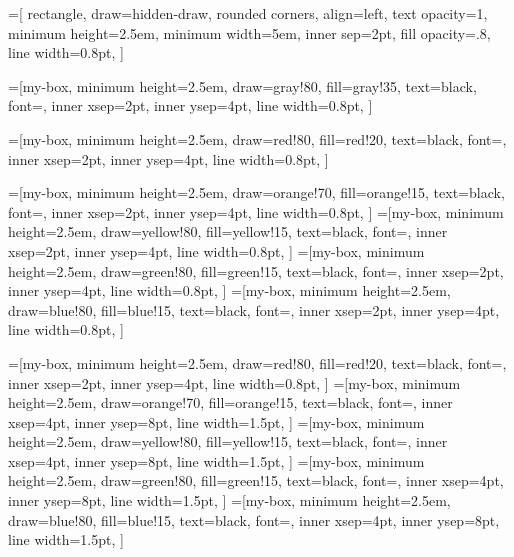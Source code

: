 

=[
    rectangle,
    draw=hidden-draw,
    rounded corners,
    align=left,
    text opacity=1,
    minimum height=2.5em,
    minimum width=5em,
    inner sep=2pt,
    fill opacity=.8,
    line width=0.8pt,
]

=[my-box, minimum height=2.5em,
    draw=gray!80, 
    fill=gray!35,  
    text=black, font=\normalsize,
    inner xsep=2pt,
    inner ysep=4pt,
    line width=0.8pt,
]

=[my-box, minimum height=2.5em,
    draw=red!80, 
    fill=red!20,  
    text=black, font=\normalsize,
    inner xsep=2pt,
    inner ysep=4pt,
    line width=0.8pt,
]

=[my-box, minimum height=2.5em,
    draw=orange!70, 
    fill=orange!15,  
    text=black, font=\normalsize,
    inner xsep=2pt,
    inner ysep=4pt,
    line width=0.8pt,
]
=[my-box, minimum height=2.5em,
    draw=yellow!80, 
    fill=yellow!15,  
    text=black, font=\normalsize,
    inner xsep=2pt,
    inner ysep=4pt,
    line width=0.8pt,
]
=[my-box, minimum height=2.5em,
    draw=green!80, 
    fill=green!15,  
    text=black, font=\normalsize,
    inner xsep=2pt,
    inner ysep=4pt,
    line width=0.8pt,
]
=[my-box, minimum height=2.5em,
    draw=blue!80, 
    fill=blue!15,  
    text=black, font=\normalsize,
    inner xsep=2pt,
    inner ysep=4pt,
    line width=0.8pt,
]

=[my-box, minimum height=2.5em,
    draw=red!80, 
    fill=red!20,  
    text=black, font=\normalsize,
    inner xsep=2pt,
    inner ysep=4pt,
    line width=0.8pt,
]
=[my-box, minimum height=2.5em,
    draw=orange!70, 
    fill=orange!15,  
    text=black, font=\normalsize,
    inner xsep=4pt,
    inner ysep=8pt,
    line width=1.5pt,
]
=[my-box, minimum height=2.5em,
    draw=yellow!80, 
    fill=yellow!15,  
    text=black, font=\normalsize,
    inner xsep=4pt,
    inner ysep=8pt,
    line width=1.5pt,
]
=[my-box, minimum height=2.5em,
    draw=green!80, 
    fill=green!15,  
    text=black, font=\normalsize,
    inner xsep=4pt,
    inner ysep=8pt,
    line width=1.5pt,
]
=[my-box, minimum height=2.5em,
    draw=blue!80, 
    fill=blue!15,  
    text=black, font=\normalsize,
    inner xsep=4pt,
    inner ysep=8pt,
    line width=1.5pt,
]

